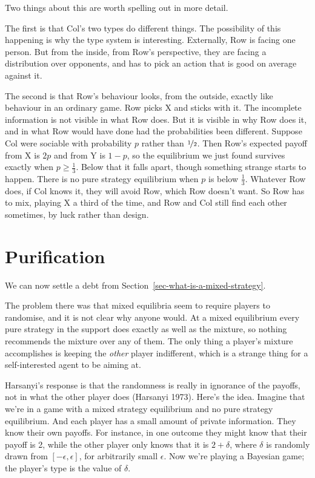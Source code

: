 \documentclass[
  11pt,
  letterpaper,
]{scrbook}
\begin{document}
Two things about this are worth spelling out in more detail.

The first is that Col's two types do different things. The possibility
of this happening is why the type system is interesting. Externally, Row
is facing one person. But from the inside, from Row's perspective, they
are facing a distribution over opponents, and has to pick an action that
is good on average against it.

The second is that Row's behaviour looks, from the outside, exactly like
behaviour in an ordinary game. Row picks X and sticks with it. The
incomplete information is not visible in what Row does. But it is
visible in why Row does it, and in what Row would have done had the
probabilities been different. Suppose Col were sociable with probability
\(p\) rather than \(\nicefrac{1}{2}\). Then Row's expected payoff from X
is \(2p\) and from Y is \(1-p\), so the equilibrium we just found
survives exactly when \(p \geqslant \frac{1}{3}\). Below that it falls
apart, though something strange starts to happen. There is no pure
strategy equilibrium when \(p\) is below \(\frac{1}{3}\). Whatever Row
does, if Col knows it, they will avoid Row, which Row doesn't want. So
Row has to mix, playing X a third of the time, and Row and Col still
find each other sometimes, by luck rather than design.

\section{Purification}\label{sec-purification}

We can now settle a debt from
Section~\ref{sec-what-is-a-mixed-strategy}.

The problem there was that mixed equilibria seem to require players to
randomise, and it is not clear why anyone would. At a mixed equilibrium
every pure strategy in the support does exactly as well as the mixture,
so nothing recommends the mixture over any of them. The only thing a
player's mixture accomplishes is keeping the \emph{other} player
indifferent, which is a strange thing for a self-interested agent to be
aiming at.

Harsanyi's response is that the randomness is really in ignorance of the
payoffs, not in what the other player does (Harsanyi 1973). Here's the
idea. Imagine that we're in a game with a mixed strategy equilibrium and
no pure strategy equilibrium. And each player has a small amount of
private information. They know their own payoffs. For instance, in one
outcome they might know that their payoff is 2, while the other player
only knows that it is \(2 + \delta\), where \(\delta\) is randomly drawn
from \([-\epsilon, \epsilon]\), for arbitrarily small \(\epsilon\). Now
we're playing a Bayesian game; the player's type is the value of
\(\delta\).
\end{document}
